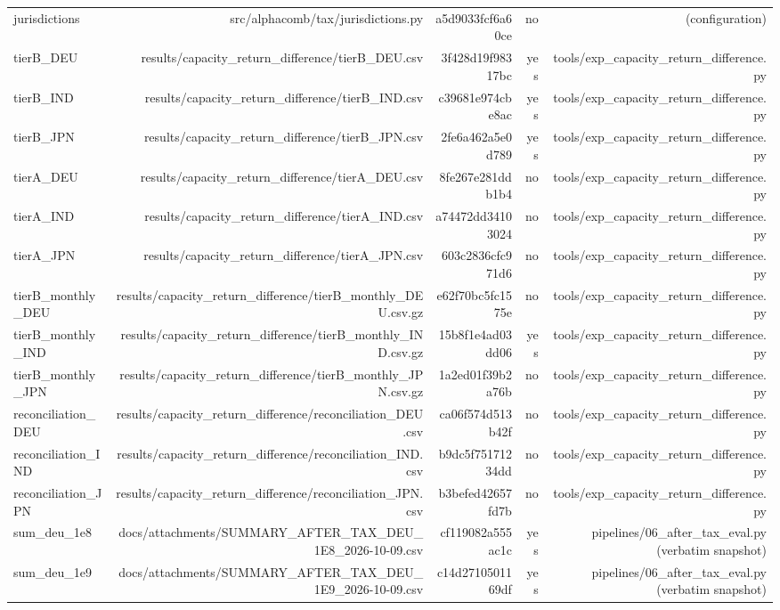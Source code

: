 \begin{table}[t]
\begin{tabular}{lrrrr}
jurisdictions & src/alphacomb/tax/jurisdictions.py & a5d9033fcf6a60ce & no & (configuration) \\
tierB\_DEU & results/capacity\_return\_difference/tierB\_DEU.csv & 3f428d19f98317bc & yes & tools/exp\_capacity\_return\_difference.py \\
tierB\_IND & results/capacity\_return\_difference/tierB\_IND.csv & c39681e974cbe8ac & yes & tools/exp\_capacity\_return\_difference.py \\
tierB\_JPN & results/capacity\_return\_difference/tierB\_JPN.csv & 2fe6a462a5e0d789 & yes & tools/exp\_capacity\_return\_difference.py \\
tierA\_DEU & results/capacity\_return\_difference/tierA\_DEU.csv & 8fe267e281ddb1b4 & no & tools/exp\_capacity\_return\_difference.py \\
tierA\_IND & results/capacity\_return\_difference/tierA\_IND.csv & a74472dd34103024 & no & tools/exp\_capacity\_return\_difference.py \\
tierA\_JPN & results/capacity\_return\_difference/tierA\_JPN.csv & 603c2836cfc971d6 & no & tools/exp\_capacity\_return\_difference.py \\
tierB\_monthly\_DEU & results/capacity\_return\_difference/tierB\_monthly\_DEU.csv.gz & e62f70bc5fc1575e & no & tools/exp\_capacity\_return\_difference.py \\
tierB\_monthly\_IND & results/capacity\_return\_difference/tierB\_monthly\_IND.csv.gz & 15b8f1e4ad03dd06 & yes & tools/exp\_capacity\_return\_difference.py \\
tierB\_monthly\_JPN & results/capacity\_return\_difference/tierB\_monthly\_JPN.csv.gz & 1a2ed01f39b2a76b & no & tools/exp\_capacity\_return\_difference.py \\
reconciliation\_DEU & results/capacity\_return\_difference/reconciliation\_DEU.csv & ca06f574d513b42f & no & tools/exp\_capacity\_return\_difference.py \\
reconciliation\_IND & results/capacity\_return\_difference/reconciliation\_IND.csv & b9dc5f75171234dd & no & tools/exp\_capacity\_return\_difference.py \\
reconciliation\_JPN & results/capacity\_return\_difference/reconciliation\_JPN.csv & b3befed42657fd7b & no & tools/exp\_capacity\_return\_difference.py \\
sum\_deu\_1e8 & docs/attachments/SUMMARY\_AFTER\_TAX\_DEU\_1E8\_2026-10-09.csv & cf119082a555ac1c & yes & pipelines/06\_after\_tax\_eval.py (verbatim snapshot) \\
sum\_deu\_1e9 & docs/attachments/SUMMARY\_AFTER\_TAX\_DEU\_1E9\_2026-10-09.csv & c14d2710501169df & yes & pipelines/06\_after\_tax\_eval.py (verbatim snapshot) \\

\end{tabular}
\end{table}

